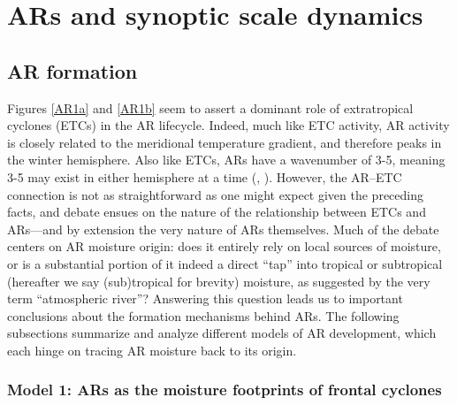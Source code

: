 \documentclass[letterpaper,12pt]{article}
\begin{document}

\section{ARs and synoptic scale dynamics}\label{sec:synAR}

\subsection{AR formation}

Figures \ref{AR1a} and \ref{AR1b} seem to assert a dominant role of extratropical cyclones (ETCs) in the AR lifecycle. Indeed, much like ETC activity, AR activity is closely related to the meridional temperature gradient, and therefore peaks in the winter hemisphere. Also like ETCs, ARs have a wavenumber of 3-5, meaning 3-5 may exist in either hemisphere at a time (\cite{Zhu1998}, \cite{Ralph2004}). However, the AR--ETC connection is not as straightforward as one might expect given the preceding facts, and debate ensues on the nature of the relationship between ETCs and ARs---and by extension the very nature of ARs themselves. Much of the debate centers on AR moisture origin: does it entirely rely on local sources of moisture, or is a substantial portion of it indeed a direct ``tap'' into tropical or subtropical (hereafter we say (sub)tropical for brevity) moisture, as suggested by the very term ``atmospheric river''? Answering this question leads us to important conclusions about the formation mechanisms behind ARs. The following subsections summarize and analyze different models of AR development, which each hinge on tracing AR moisture back to its origin. 

\subsubsection{Model 1: ARs as the moisture footprints of frontal cyclones}
\end{document}
